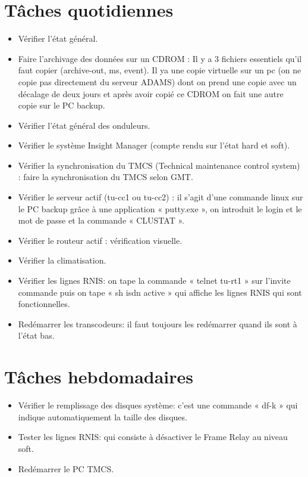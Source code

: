 \section*{Tâches quotidiennes}
\begin{itemize}
\item Vérifier l’état général.  \\
\item Faire l’archivage des données sur un CDROM : Il y a 3 fichiers essentiels qu’il faut copier (archive-out, ms,  event). Il ya une copie virtuelle sur un pc (on ne copie pas directement du serveur ADAMS) dont on prend une copie avec un décalage de deux jours et après avoir copié ce CDROM on fait une autre copie sur le PC  backup.\\
\item Vérifier l’état général des onduleurs.\\
\item Vérifier le système Insight Manager (compte rendu sur l’état hard et soft).\\
\item Vérifier la synchronisation du TMCS (Technical maintenance control system) : faire la synchronisation du TMCS selon GMT.\\
\item Vérifier le serveur actif (tu-cc1 ou tu-cc2) : il s’agit d’une commande linux sur le PC  backup grâce à une application « putty.exe », on introduit le login et le mot de passe et la commande « CLUSTAT ». \\
\item Vérifier le routeur actif : vérification visuelle. \\
\item Vérifier la climatisation.\\
\item Vérifier les lignes RNIS: on tape la commande « telnet tu-rt1 » sur l’invite commande puis on tape « sh isdn active » qui affiche les lignes RNIS qui sont fonctionnelles.\\
\item Redémarrer les transcodeurs: il faut toujours les redémarrer quand ils sont à l’état bas.\\
\end{itemize}

\section*{Tâches hebdomadaires}
\begin{itemize}
\item Vérifier le remplissage des disques système: c’est une commande « df-k » qui  indique automatiquement la taille des disques.\\
\item Tester les lignes RNIS: qui consiste à désactiver le Frame Relay au niveau soft.\\
\item Redémarrer le PC TMCS.
\end{itemize}


